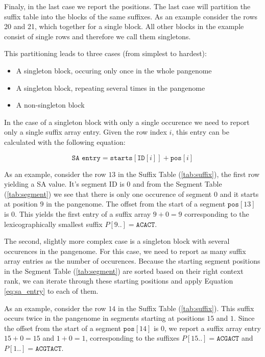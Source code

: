 Finaly, in the last case we report the positions.
The last case will partition the suffix table into the blocks of the same suffixes.
As an example consider the rows 20 and 21, which together for a single block.
All other blocks in the example consist of single rows and therefore we call them singletons.

This partitioning leads to three cases (from simplest to hardest):
\begin{itemize}
    \item A singleton block, occuring only once in the whole pangenome
    \item A singleton block, repeating several times in the pangenome
    \item A non-singleton block
\end{itemize}

In the case of a singleton block with only a single occurence we need to report only a single suffix array entry.
Given the row index $i$, this entry can be calculated with the following equation:

\begin{equation}
    \label{eq:sa_entry}
    \texttt{SA entry} = \texttt{starts}[\texttt{ID}[i]] + \texttt{pos}[i]
\end{equation}

As an example, consider the row $13$ in the Suffix Table (\ref{tab:suffix}), the first row yielding a SA value.
It's segment ID is $0$ and from the Segment Table (\ref{tab:segment}) we see that there is only one occurence of segment $0$ and it starts at position $9$ in the pangenome.
The offset from the start of a segment $\texttt{pos}[13]$ is $0$.
This yields the first entry of a suffix array $9 + 0 = 9$ corresponding to the lexicographically smallest suffix $P[9..] = \texttt{ACACT}$.

The second, slightly more complex case is a singleton block with several occurences in the pangenome.
For this case, we need to report as many suffix array entries as the number of occurences.
Because the starting segment positions in the Segment Table (\ref{tab:segment}) are sorted based on their right context rank, we can iterate through these starting positions and apply Equation \ref{eq:sa_entry} to each of them.

As an example, consider the row $14$ in the Suffix Table (\ref{tab:suffix}).
This suffix occurs twice in the pangenome in segments starting at positions $15$ and $1$.
Since the offset from the start of a segment $\texttt{pos}[14]$ is $0$, we report a suffix array entry $15 + 0 = 15$ and $1 + 0 = 1$, corresponding to the suffixes $P[15..] = \texttt{ACGACT}$ and $P[1..] = \texttt{ACGTACT}$.

